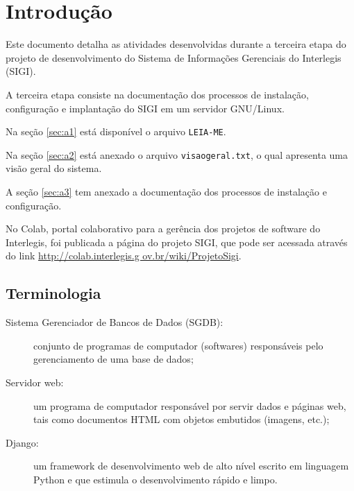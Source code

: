 %
%

\section{Introdução}
Este documento detalha as atividades desenvolvidas durante a terceira
etapa do projeto de desenvolvimento do Sistema de Informações
Gerenciais do Interlegis (SIGI).

A terceira etapa consiste na documentação dos processos de instalação,
configuração e implantação do SIGI em um servidor GNU/Linux.

Na seção \ref{sec:a1} está disponível o arquivo \verb|LEIA-ME|.

Na seção \ref{sec:a2} está anexado o arquivo \verb|visaogeral.txt|, o
qual apresenta uma visão geral do sistema.

A seção \ref{sec:a3} tem anexado a documentação dos processos de
instalação e configuração.

No Colab, portal colaborativo para a gerência dos projetos de software
do Interlegis, foi publicada a página do projeto SIGI, que pode
ser acessada através do link
\href{http://colab.interlegis.gov.br/wiki/ProjetoSigi}{http://colab.interlegis.g ov.br/wiki/ProjetoSigi}.

\subsection{Terminologia}
\begin{description}
\item[Sistema Gerenciador de Bancos de Dados (SGDB):] conjunto de
  programas de computador (softwares) responsáveis pelo gerenciamento
  de uma base de dados;
\item[Servidor web:] um programa de computador responsável por servir
  dados e páginas web, tais como documentos HTML com objetos embutidos
  (imagens, etc.);
\item[Django:] um framework de desenvolvimento web de alto nível
  escrito em linguagem Python e que estimula o desenvolvimento rápido
  e limpo.
\end{description}

%
%
